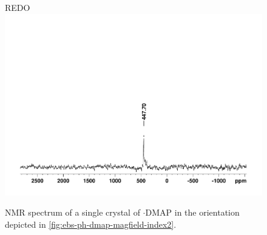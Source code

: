 \begin{refsection}
\begin{figure}
  \centering
  REDO
  \includegraphics[width=0.8\linewidth]{Figures/ebs-dmap-hahnecho-77se.pdf}
  \caption{ NMR spectrum of a single crystal of $\cdot$DMAP in the orientation depicted in \cref{fig:ebs-ph-dmap-magfield-index2}.}
  \label{fig:ebs-dmap-hahnecho-77se2}
\end{figure}


\end{refsection}

